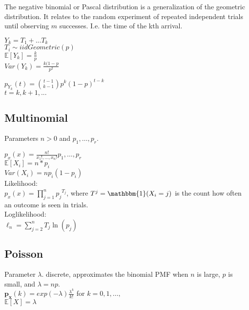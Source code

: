 The negative binomial or Pascal distribution is a generalization of the geometric distribution. It relates to the random experiment of repeated independent trials until observing $m$ successes. I.e. the time of the kth arrival.

$Y_k=T_1+...T_k$\\

$T_i \sim iid Geometric(p)$\\

$\mathbb{E}[Y_k]=\frac{k}{p}$\\

$Var(Y_k)= \frac{k(1-p}{p^2}$

$p_{Y_k}(t) ={t-1 \choose k-1}p^k(1-p)^{t-k}$\\

$t=k,k+1,...$


\subsection*{Multinomial}

Parameters $n>0$ and $p_1, \ldots, p_r$.

$p_x(x)= \frac{n!}{x_1!,\ldots,x_n!} p_1, \ldots, p_r$\\


$\mathbb{E}[X_i]=n*p_i$\\

$Var(X_i)=np_i(1-p_i)$\\


Likelihood:\\

$p_x(x)= \prod _{j=1}^{n}{p_{{j}}}^{T_{{j}}}$, where $T^j=\mathbbm{1}( X_i=j)$ is the count how often an outcome is seen in trials. \\

Loglikelihood:\\
$\ell_n= \sum _{j=2}^{n}T_{{j}}\ln  \left( p_{{j}} \right)$\\


\subsection*{Poisson}
Parameter $\lambda$. discrete, approximates the binomial PMF when $n$ is large, $p$ is small, and $\lambda = np$.\\

$\mathbf{p_x}(k)=exp(-\lambda)\frac{\lambda^k}{k!}$ for $k=0,1, \ldots,$\\

$\mathbb{E}[X]=\lambda$\\


